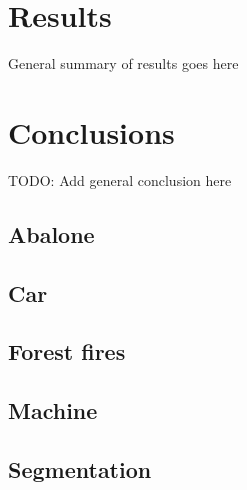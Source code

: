 \documentclass[twoside,11pt]{article}
\begin{document}


\section{Results}
General summary of results goes here

\section{Conclusions}

TODO: Add general conclusion here

\subsection{Abalone}

\subsection{Car}

\subsection{Forest fires}

\subsection{Machine}

\subsection{Segmentation}


\acks{}

\end{document}

